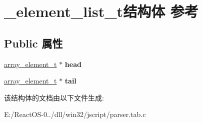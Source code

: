 \hypertarget{struct__element__list__t}{}\section{\+\_\+element\+\_\+list\+\_\+t结构体 参考}
\label{struct__element__list__t}
\subsection*{Public 属性}
\begin{DoxyCompactItemize}
\item 
\mbox{\label{struct__element__list__t_a59f4a84f0126d34b67e12bed27486e88}} 
\hyperlink{struct__array__element__t}{array\+\_\+element\+\_\+t} $\ast$ {\bfseries head}
\item 
\mbox{\label{struct__element__list__t_ac52e8f3cd26f925c40c90f58ab816967}} 
\hyperlink{struct__array__element__t}{array\+\_\+element\+\_\+t} $\ast$ {\bfseries tail}
\end{DoxyCompactItemize}


该结构体的文档由以下文件生成\+:\begin{DoxyCompactItemize}
\item 
E\+:/\+React\+O\+S-\/0../dll/win32/jscript/parser.\+tab.\+c\end{DoxyCompactItemize}
